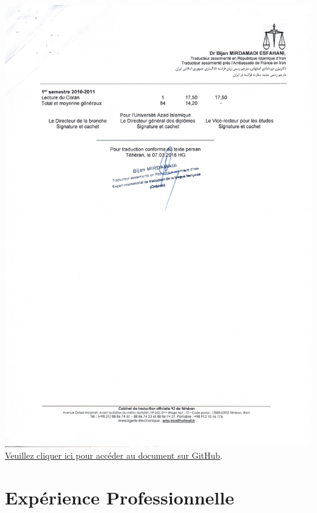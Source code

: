 \documentclass{article}
\begin{document}
        \begin{center}
            \includegraphics[width=\textwidth,height=\textheight,keepaspectratio]{../Document/Education/Accounting/08-05-2017 releve de notes - Comptabilite - P02.jpg}
            \footnotesize
             \href{https://github.com/jafarizadeh/CV---lettre/tree/079f60796b41475881d7ba4a70abc3254d3dd466/Document/Education/Accounting}{Veuillez cliquer ici pour accéder au document sur GitHub}.
        \end{center}

    \newpage

   


\section{Expérience Professionnelle}
\end{document}
